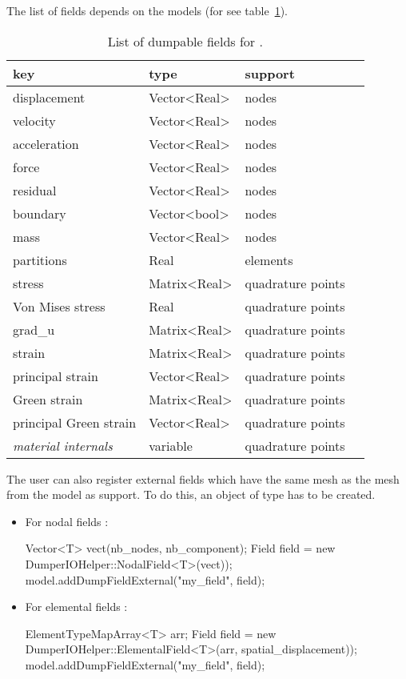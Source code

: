 The list of fields depends on the models (for
 see table~\ref{tab:io:smm_field_list}).

\begin{table}
  \centering
  \begin{tabular}{llll}
    \toprule
    key          &    type      & support \\
    \midrule
    displacement & Vector<Real> & nodes  \\
    velocity     & Vector<Real> & nodes  \\
    acceleration & Vector<Real> & nodes  \\
    force	       & Vector<Real> & nodes  \\
    residual     & Vector<Real> & nodes  \\
    boundary     & Vector<bool> & nodes  \\
    mass         & Vector<Real> & nodes  \\
    partitions   & Real         & elements \\
    stress & Matrix<Real> & quadrature points  \\
    Von Mises stress & Real & quadrature points  \\
    grad\_u & Matrix<Real> & quadrature points  \\
    strain & Matrix<Real> & quadrature points  \\
    principal strain & Vector<Real> & quadrature points  \\
    Green strain & Matrix<Real> & quadrature points  \\
    principal Green strain & Vector<Real> & quadrature points  \\
    \textit{material internals} & variable  & quadrature points  \\
    \bottomrule
  \end{tabular}
  \caption{List of dumpable fields for .}
  \label{tab:io:smm_field_list}
\end{table}

The user can also register external fields which have the same mesh as the mesh from the model as support. To do this, an object of type  has to be created.

\begin{itemize}
\item For nodal fields :
\begin{cpp}
  Vector<T> vect(nb_nodes, nb_component);
  Field field = new DumperIOHelper::NodalField<T>(vect));
  model.addDumpFieldExternal("my_field", field);
\end{cpp}

\item For elemental fields :
\begin{cpp}
  ElementTypeMapArray<T> arr;
  Field field = new DumperIOHelper::ElementalField<T>(arr, spatial_displacement));
  model.addDumpFieldExternal("my_field", field);
\end{cpp}
\end{itemize}

